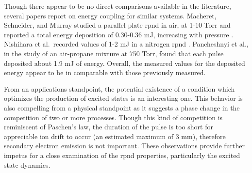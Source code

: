 Though there appear to be no direct comparisons available in the literature,
several papers report on energy coupling for similar systems. Macheret,
Schneider, and Murray studied a parallel plate \acs{rpnd} in air, at 1-10 Torr
and reported a total energy deposition of 0.30-0.36 mJ, increasing with pressure
\cite{Macheret2006}. Nishihara et al.\ recorded values of 1-2 mJ in a nitrogen
\acs{rpnd} \cite{Nishihara2006}. Pancheshnyi et al., in the study of an
air-propane mixture at 750 Torr, found that each pulse deposited about 1.9 mJ of
energy. Overall, the measured values for the deposited energy appear to be in
comparable with those previously measured.

From an applications standpoint, the potential existence of a condition which
optimizes the production of excited states is an interesting one. This behavior
is also compelling from a physical standpoint as it suggests a phase change in
the competition of two or more processes. Though this kind of competition is
reminiscent of Paschen's law, the duration of the pulse is too short for
appreciable ion drift to occur (an estimated maximum of 3 mm), therefore
secondary electron emission is not important. These observations provide further
impetus for a close examination of the \acs{rpnd} properties, particularly the
excited state dynamics.

